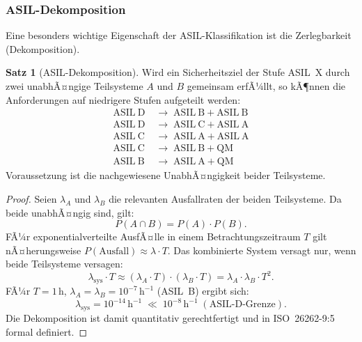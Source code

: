 ﻿\documentclass[a4paper,12pt]{article}
\theoremstyle{definition}
\newtheorem{satz}{Satz}
\begin{document}
\subsubsection{ASIL-Dekomposition}

Eine besonders wichtige Eigenschaft der ASIL-Klassifikation ist die
Zerlegbarkeit (Dekomposition).

\begin{satz}[ASIL-Dekomposition]
\label{satz:dekomposition}
  Wird ein Sicherheitsziel der Stufe ASIL~X durch zwei unabhÃ¤ngige
  Teilsysteme $A$ und $B$ gemeinsam erfÃ¼llt, so kÃ¶nnen die Anforderungen
  auf niedrigere Stufen aufgeteilt werden:
  \begin{align*}
    \mathrm{ASIL~D} &\;\rightarrow\; \mathrm{ASIL~B} + \mathrm{ASIL~B}\\
    \mathrm{ASIL~D} &\;\rightarrow\; \mathrm{ASIL~C} + \mathrm{ASIL~A}\\
    \mathrm{ASIL~C} &\;\rightarrow\; \mathrm{ASIL~A} + \mathrm{ASIL~A}\\
    \mathrm{ASIL~C} &\;\rightarrow\; \mathrm{ASIL~B} + \mathrm{QM}\\
    \mathrm{ASIL~B} &\;\rightarrow\; \mathrm{ASIL~A} + \mathrm{QM}
  \end{align*}
  Voraussetzung ist die nachgewiesene UnabhÃ¤ngigkeit beider Teilsysteme.
\end{satz}

\begin{proof}
  Seien $\lambda_A$ und $\lambda_B$ die relevanten Ausfallraten der
  beiden Teilsysteme. Da beide unabhÃ¤ngig sind, gilt:
  \[
    P(A \cap B) = P(A) \cdot P(B).
  \]
  FÃ¼r exponentialverteilte AusfÃ¤lle in einem Betrachtungszeitraum $T$
  gilt nÃ¤herungsweise $P(\text{Ausfall}) \approx \lambda \cdot T$.
  Das kombinierte System versagt nur, wenn beide Teilsysteme versagen:
  \[
    \lambda_{\mathrm{sys}} \cdot T
    \approx (\lambda_A \cdot T) \cdot (\lambda_B \cdot T)
    = \lambda_A \cdot \lambda_B \cdot T^2.
  \]
  FÃ¼r $T = 1\,\mathrm{h}$, $\lambda_A = \lambda_B = 10^{-7}\,\mathrm{h}^{-1}$
  (ASIL~B) ergibt sich:
  \[
    \lambda_{\mathrm{sys}} = 10^{-14}\,\mathrm{h}^{-1}
    \;\ll\; 10^{-8}\,\mathrm{h}^{-1}\;(\text{ASIL-D-Grenze}).
  \]
  Die Dekomposition ist damit quantitativ gerechtfertigt und in
  ISO~26262-9:5 formal definiert.
\end{proof}

\end{document}

